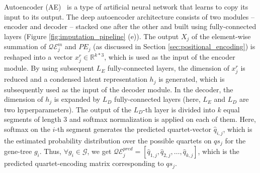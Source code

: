 Autoencoder (AE)~\cite{goodfellow2016deep} is a type of artificial neural network that learns to copy its input to its output. The deep autoencoder architecture consists of two modules -- encoder and decoder -- stacked one after the other and built using fully-connected layers (Figure \ref{fig:imputation_pipeline} (e)). 
The output $X_j$ of the element-wise summation of $\mathcal{QE}^{m}_j$ and $PE_j$ (as discussed in Section \ref{sec:positional_encoding}) is reshaped into a vector $x^r_j \in \mathbb{R}^{k * 3}$, which is used as the input of the encoder module. By using subsequent $L_E$ fully-connected layers, the dimension of $x^r_j$ is reduced and a condensed latent representation $h_j$ is generated, which is subsequently used as the input of the decoder module. In the decoder, the dimension of $h_j$ is expanded by $L_D$ fully-connected layers (here, $L_E$ and $L_D$ are two hyperparameters). 
The output of the $L_D$-th layer is divided into $k$ equal segments of length $3$ %
and softmax normalization is applied on each of them. Here, softmax on the $i$-th segment generates the predicted quartet-vector $\hat{q}_{i,j}$, which is the estimated probability distribution over the possible quartets on $qs_j$ for the gene-tree $g_i$. Thus, $\forall g_i \in \mathcal{G}$, we get $\mathcal{QE}^{pred}_j = [\hat{q}_{1,j}, \hat{q}_{2,j}, \dots, \hat{q}_{k,j}]$, which is the predicted quartet-encoding matrix corresponding to $qs_j$. 



